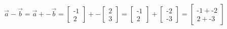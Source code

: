 \documentclass[preview]{standalone}
\begin{document}
\begin{align*}
\vec{a} - \vec{b} = \vec{a} + - \vec{b} = \begin{bmatrix} \text{-}1 \\ 2 \end{bmatrix} + - \begin{bmatrix} 2 \\ 3 \end{bmatrix} = \begin{bmatrix} \text{-}1 \\ 2 \end{bmatrix} + \begin{bmatrix} \text{-}2 \\ \text{-}3 \end{bmatrix}= \begin{bmatrix} \text{-}1 + \text{-}2 \\ 2 + \text{-}3 \end{bmatrix}
\end{align*}
\end{document}
